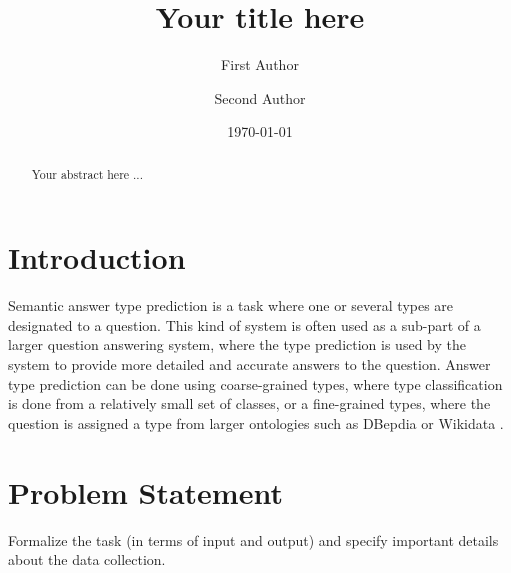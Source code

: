 \documentclass[sigconf]{acmart}
\begin{document}
\title{Your title here}

\author{First Author}
\affiliation{}

\author{Second Author}
\affiliation{}

\date{\today}



\begin{abstract}
Your abstract here ...
\end{abstract}


\renewcommand\footnotetextcopyrightpermission[1]{}
\pagestyle{plain}

\maketitle


\section{Introduction}


Semantic answer type prediction is a task where one or several types are designated to a question. This kind of system is often used as a sub-part of a larger question answering system, where the type prediction is used by the system to provide more detailed and accurate answers to the question. Answer type prediction can be done using coarse-grained types, where type classification is done from a relatively small set of classes, or a fine-grained types, where the question is assigned a type from larger ontologies such as DBepdia or Wikidata \cite{mihindukulasooriya_semantic_2020}.

\section{Problem Statement}

Formalize the task (in terms of input and output) and specify important details about the data collection.
\end{document}
